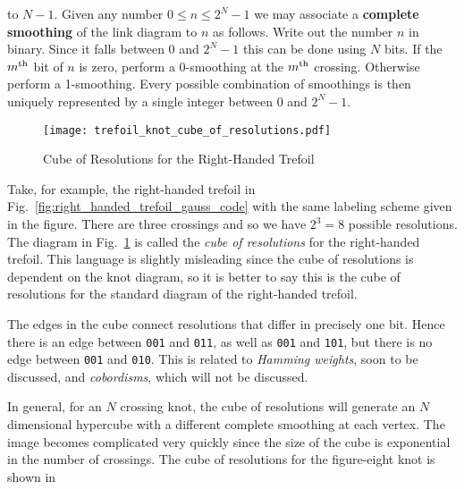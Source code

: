         to $N-1$. Given any number $0\leq{n}\leq{2}^{N}-1$ we may associate a
        \textbf{complete smoothing} of the link diagram to $n$ as follows.
        Write out the number $n$ in binary. Since it falls between $0$ and
        $2^{N}-1$ this can be done using $N$ bits. If the
        $m^{\small\textrm{th}}$ bit of $n$ is zero, perform a 0-smoothing at
        the $m^{\small\textrm{th}}$ crossing. Otherwise perform a 1-smoothing.
        Every possible combination of smoothings is then uniquely represented
        by a single integer between $0$ and $2^{N}-1$.
        \par\hfill\par
        \begin{figure}
            \centering
            \texttt{[image: trefoil\_knot\_cube\_of\_resolutions.pdf]}
            \caption{Cube of Resolutions for the Right-Handed Trefoil}
            \label{fig:trefoil_knot_cube_of_resolutions}
        \end{figure}
        Take, for example, the right-handed trefoil in
        Fig.~\ref{fig:right_handed_trefoil_gauss_code} with the same labeling
        scheme given in the figure. There are three crossings and so we have
        $2^{3}=8$ possible resolutions. The diagram
        in Fig.~\ref{fig:trefoil_knot_cube_of_resolutions} is called the
        \textit{cube of resolutions} for the right-handed trefoil.
        This language is slightly misleading since the cube of
        resolutions is dependent on the knot diagram, so it is better to say
        this is the cube of resolutions for the standard diagram of
        the right-handed trefoil.
        \par\hfill\par
        The edges in the cube connect resolutions that differ in precisely one
        bit. Hence there is an edge between \texttt{001} and \texttt{011},
        as well as \texttt{001} and \texttt{101}, but there is no edge between
        \texttt{001} and \texttt{010}. This is related to
        \textit{Hamming weights}, soon to be discussed, and \textit{cobordisms},
        which will not be discussed.
        \par\hfill\par
        In general, for an $N$ crossing knot, the cube of resolutions will
        generate an $N$ dimensional hypercube with a different complete
        smoothing at each vertex. The image becomes complicated very quickly
        since the size of the cube is exponential in the number of crossings.
        The cube of resolutions for the figure-eight knot is shown in
